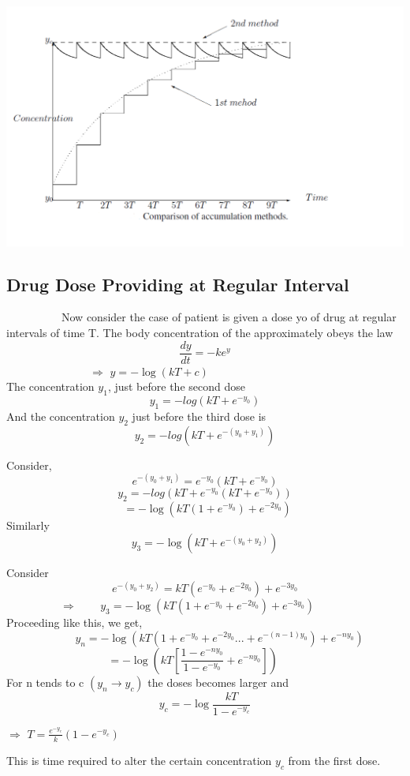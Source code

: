 \begin{center} %
		\scalebox{0.80} %
		{\includegraphics{graph7.png}} 
\end{center}


\subsection{Drug Dose Providing at Regular Interval}
\par ~~~~~~~~~~Now consider the case of patient is given a dose yo of drug at regular intervals of time T. The body concentration of the approximately obeys the law
$$\frac{dy}{dt}=-ke^{y}$$
$~~~~~~~~~~~~~~~~~~~~~~~~~~~~~~~~~~\Rightarrow$  $y=-\log (kT+c)$ \\
The concentration $y_{1}$, just before the second dose
$$y_{1}=-log(kT+e^{-y_{0}})$$
And the concentration $y_{2}$ just before the third dose is 
$$y_{2}=-log(kT+e^{-(y_{0}+y_{1})})$$

Consider,$$e^{-(y_{0}+y_{1})}=e^{-y_{0}}(kT+e^{-y_{0}})$$
$$y_{2}=-log(kT+e^{-y_{0}}(kT+e^{-y_{0}}))$$
$$~~=-\log (kT(1+e^{-y_{0}})+e^{-2y_{0}})$$
Similarly $$y_{3}=-\log (kT+e^{-(y_{0}+y_{2})})$$

Consider $$e^{-(y_{0}+y_{2})}=kT(e^{-y_{0}}+e^{-2y_{0}})+e^{-3y_{0}}$$
$~~~~~~~~~~~~~~~~~~~~~~\Rightarrow$  $~~~~~~~~y_{3}=-\log(kT(1+e^{-y_{0}}+e^{-2y_{0}})+e^{-3y_{0}})$ \\

Proceeding like this, we get,
$$~~~~~~~~~~~~y_{n}=-\log(kT(1+e^{-y_{0}}+e^{-2y_{0}}...+e^{-(n-1)y_{0}})+e^{-ny_{0}})$$
$$=-\log(kT[\frac{1-e^{-ny_{0}}}{1-e^{-y_{0}}}+e^{-ny_{0}}])~~~~~~~~~~$$
For n tends to c $(y_{n}\rightarrow y_{c})$ the doses becomes larger and
$$y_{c}=-\log\frac{kT}{1-e^{-y_{c}}}$$
\begin{center}
	$\Rightarrow$ $T=\frac{e^{-y_{c}}}{k}(1-e^{-y_{c}})$
\end{center} 
This is time required to alter the certain concentration $y_{c}$ from the first dose. 





